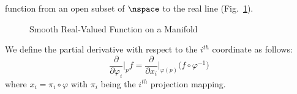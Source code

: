 \documentclass{book}                                                            %
\begin{document}
                function from an open subset of $\nspace$ to the real line 
                (Fig.~\ref{fig:Partials_on_Manifold}).
                \begin{figure}
                    \centering
                    \captionsetup{type=figure}
                    
                    \caption{Smooth Real-Valued Function on a Manifold}
                    \label{fig:Partials_on_Manifold}
                \end{figure}
                We define the partial derivative with respect to the
                $i^{th}$ coordinate as follows:
                \begin{equation}
                    \frac{\partial}{\partial{\varphi}_{i}}\Big|_{p}f
                    =\frac{\partial}{\partial{x}_{i}}\Big|_{\varphi(p)}
                        \big(f\circ\varphi^{\minus{1}}\big)
                \end{equation}
                where $x_{i}=\pi_{i}\circ\varphi$ with $\pi_{i}$ being the
                $i^{th}$ projection mapping.
\end{document}
